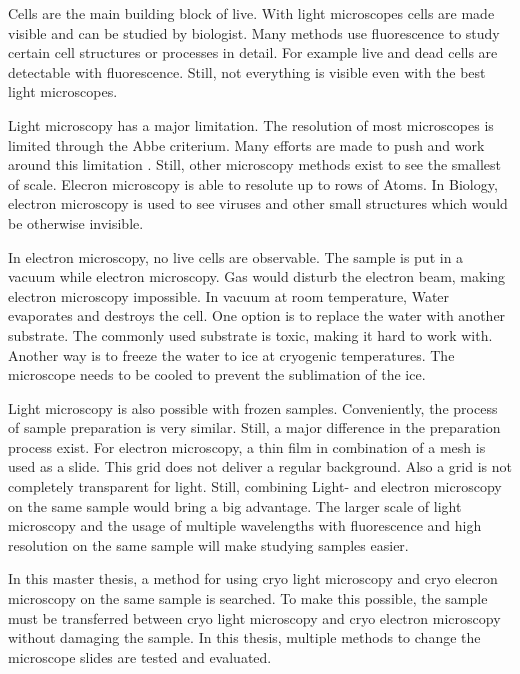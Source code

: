 

Cells are the main building block of live. With light microscopes cells are made visible and can be studied by biologist. Many methods use fluorescence to study certain cell structures or processes in detail. For example live and dead cells are detectable with fluorescence. Still, not everything is visible even with the best light microscopes.

Light microscopy has a major limitation. The resolution of most microscopes is limited through the Abbe criterium. Many efforts are made to push and work around this limitation \cite{Heintzmann.2006}. Still, other microscopy methods exist to see the smallest of scale. Elecron microscopy is able to resolute up to rows of Atoms. In Biology, electron microscopy is used to see viruses and other small structures which would be otherwise invisible. 

In electron microscopy, no live cells are observable. The sample is put in a vacuum while electron microscopy. Gas would disturb the electron beam, making electron microscopy impossible. In vacuum at room temperature, Water evaporates and destroys the cell. One option is to replace the water with another substrate. The commonly used substrate is toxic, making it hard to work with. Another way is to freeze the water to ice at cryogenic temperatures. The microscope needs to be cooled to prevent the sublimation of the ice.

Light microscopy is also possible with frozen samples. Conveniently, the process of sample preparation is very similar. Still, a major difference in the preparation process exist. For electron microscopy, a thin film in combination of a mesh is used as a slide. This grid does not deliver a regular background. Also a grid is not completely transparent for light. Still, combining Light- and electron microscopy on the same sample would bring a big advantage. The larger scale of light microscopy and the usage of multiple wavelengths with fluorescence and high resolution on the same sample will make studying samples easier.

In this master thesis, a method for using cryo light microscopy and cryo elecron microscopy on the same sample is searched. To make this possible, the sample must be transferred between cryo light microscopy and cryo electron microscopy without damaging the sample. In this thesis, multiple methods to change the microscope slides are tested and evaluated.


